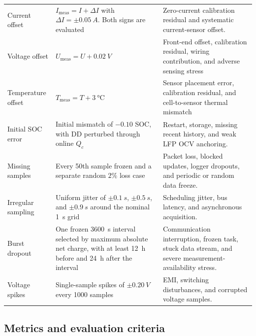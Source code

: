 \begin{longtable}{@{}>{\raggedright\arraybackslash}p{2.4cm}>{\raggedright\arraybackslash}p{4.5cm}>{\raggedright\arraybackslash}p{5.8cm}@{}}
    \addlinespace[3pt]
    Current offset & $I_{\mathrm{meas}}=I+\Delta I$ with $\Delta I=\pm\SI{0.05}{A}$. Both signs are evaluated & Zero-current calibration residual and systematic current-sensor offset.\autocite{DesignConsiderationsCurrent,TMCS11083Functional,TLE4972HighPrecision} \\
    \addlinespace[3pt]
    Voltage offset & $U_{\mathrm{meas}}=U+\SI{0.02}{V}$ & Front-end offset, calibration residual, wiring contribution, and adverse sensing stress \\
    \addlinespace[3pt]
    Temperature offset & $T_{\mathrm{meas}}=T+\SI{3}{\celsius}$ & Sensor placement error, calibration residual, and cell-to-sensor thermal mismatch \\
    \addlinespace[3pt]
    Initial SOC error & Initial mismatch of $-0.10$ SOC, with DD perturbed through online $Q_c$ & Restart, storage, missing recent history, and weak LFP OCV anchoring.\autocite{liRobustnessSOCEstimation2015,gaoEnhancedStateofchargeEstimation2022} \\
    \addlinespace[3pt]
    Missing samples & Every 50th sample frozen and a separate random $2\%$ loss case & Packet loss, blocked updates, logger dropouts, and periodic or random data freeze.\autocite{naseriReliableWirelessBMS2025,liuAssessingImpactSampling2025} \\
    \addlinespace[3pt]
    Irregular sampling & Uniform jitter of $\pm\SI{0.1}{s}$, $\pm\SI{0.5}{s}$, and $\pm\SI{0.9}{s}$ around the nominal \SI{1}{s} grid & Scheduling jitter, bus latency, and asynchronous acquisition.\autocite{bergerBenchmarkingBatteryManagement2024,naseriReliableWirelessBMS2025,liuAssessingImpactSampling2025} \\
    \addlinespace[3pt]
    Burst dropout & One frozen \SI{3600}{s} interval selected by maximum absolute net charge, with at least 12~h before and 24~h after the interval & Communication interruption, frozen task, stuck data stream, and severe measurement-availability stress.\autocite{bergerBenchmarkingBatteryManagement2024,naseriReliableWirelessBMS2025} \\
    \addlinespace[3pt]
    Voltage spikes & Single-sample spikes of $\pm\SI{0.20}{V}$ every 1000 samples & EMI, switching disturbances, and corrupted voltage samples.\autocite{aielloElectromagneticSusceptibilityBattery2020} \\
\end{longtable}
\endgroup

\subsection{Metrics and evaluation criteria}
\label{sec:robustness_metrics}

